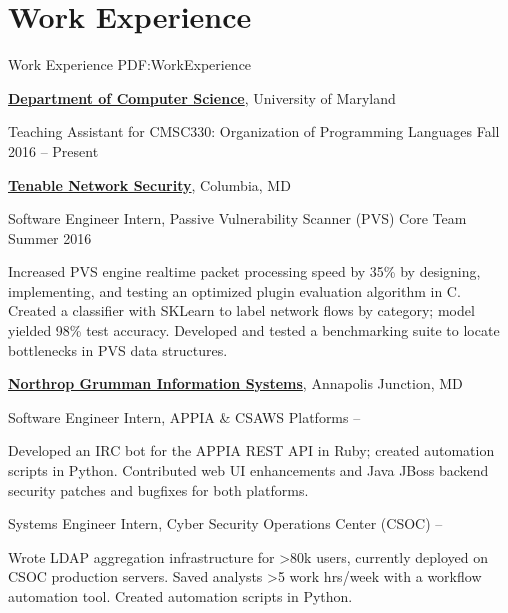 
\section
{Work Experience}
{Work Experience}
{PDF:WorkExperience}

\href{https://cs.umd.edu/}
{\textbf{Department of Computer Science}},
University of Maryland
\hfill

\GapNoBreak
\hspace{1em} Teaching Assistant for CMSC330: Organization of Programming Languages
\hfill
Fall 2016 -- 
Present

\GapNoBreak
\href{https://www.tenable.com/}
{\textbf{Tenable Network Security}},
Columbia, MD

\GapNoBreak
\hspace{1em} Software Engineer Intern, Passive Vulnerability Scanner (PVS) Core Team
\hfill
Summer 2016
\begin{detail}
\SubBulletItem
Increased PVS engine realtime packet processing speed by 35\% by designing, implementing, and testing an optimized plugin evaluation algorithm in C.
\SubBulletItem
Created a classifier with SKLearn to label network flows by category; model yielded 98\% test accuracy.
\SubBulletItem
Developed and tested a benchmarking suite to locate bottlenecks in PVS data structures.
\end{detail}

\Gap
\href{https://www.ngc.com/}
{\textbf{Northrop Grumman Information Systems}},
Annapolis Junction, MD

\GapNoBreak
\hspace{1em} 
Software Engineer Intern, APPIA \& CSAWS Platforms
\hfill
{} --
\begin{detail}
\SubBulletItem
Developed an IRC bot for the APPIA REST API in Ruby; created automation scripts in Python.
\SubBulletItem
Contributed web UI enhancements and Java JBoss backend security patches and bugfixes for both platforms.
\end{detail}

\GapNoBreak
\hspace{1em} 
Systems Engineer Intern, Cyber Security Operations Center (CSOC)
\hfill
{} --
\begin{detail}
\SubBulletItem
Wrote LDAP aggregation infrastructure for >80k users, currently deployed on CSOC production servers.
\SubBulletItem
Saved analysts >5 work hrs/week with a workflow automation tool. Created automation scripts in Python.
\end{detail}
